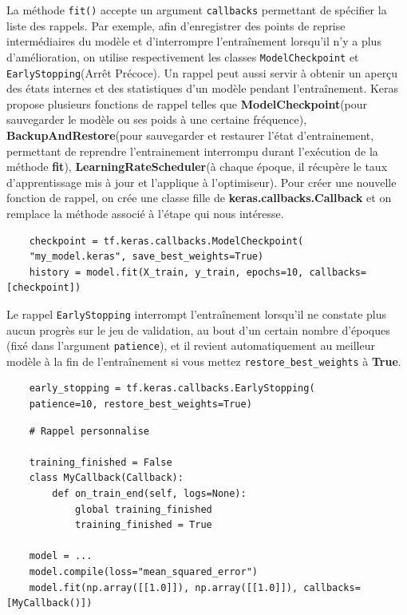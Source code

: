 \documentclass[a4paper,12pt,twoside]{report}
\theoremstyle{definition}
\theoremstyle{plain}
\theoremstyle{remark}
\begin{document}
La méthode \texttt{fit()} accepte un argument \texttt{callbacks} permettant de spécifier la liste des rappels. Par exemple, afin d'enregistrer des points de reprise intermédiaires du modèle et d'interrompre l'entraînement lorsqu'il n'y a plus d'amélioration, on utilise respectivement les classes \texttt{ModelCheckpoint} et \texttt{EarlyStopping}(Arrêt Précoce). Un rappel peut aussi servir à obtenir un aperçu des états internes et des statistiques d'un modèle pendant l'entraînement. Keras propose plusieurs fonctions de rappel telles que \textbf{ModelCheckpoint}(pour sauvegarder le modèle ou ses poids à une certaine fréquence), \textbf{BackupAndRestore}(pour sauvegarder et restaurer l'état d'entrainement, permettant de reprendre l'entrainement interrompu durant l'exécution de la méthode \textbf{fit}), \textbf{LearningRateScheduler}(à chaque époque, il récupère le taux d'apprentissage mis à jour et l'applique à l'optimiseur). Pour créer une nouvelle fonction de rappel, on crée une classe fille de \textbf{keras.callbacks.Callback} et on remplace la méthode associé à l'étape qui nous intéresse.

\begin{lstlisting}
	checkpoint = tf.keras.callbacks.ModelCheckpoint(
	"my_model.keras", save_best_weights=True)
	history = model.fit(X_train, y_train, epochs=10, callbacks=[checkpoint])
\end{lstlisting}

Le rappel \texttt{EarlyStopping} interrompt l'entraînement lorsqu'il ne constate plus aucun progrès sur le jeu de validation, au bout d'un certain nombre d'époques (fixé dans l'argument \texttt{patience}), et il revient automatiquement au meilleur modèle à la fin de l'entraînement si vous mettez \texttt{restore\_best\_weights} à \textbf{True}.

\begin{lstlisting}
	early_stopping = tf.keras.callbacks.EarlyStopping(
	patience=10, restore_best_weights=True)
\end{lstlisting}

\begin{lstlisting}
	# Rappel personnalise
	
	training_finished = False
	class MyCallback(Callback):
		def on_train_end(self, logs=None):
			global training_finished
			training_finished = True
	
	model = ...
	model.compile(loss="mean_squared_error")
	model.fit(np.array([[1.0]]), np.array([[1.0]]), callbacks=[MyCallback()])
\end{lstlisting}
\end{document}
